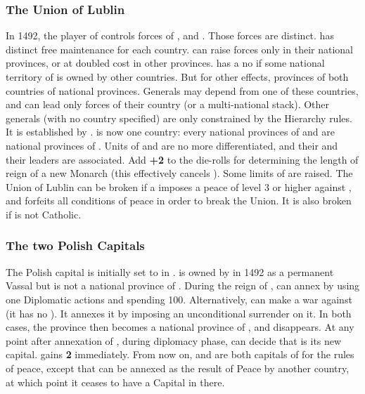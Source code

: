 \subsubsection{The Union of Lublin}
\aparag\label{chSpecific:Poland:Before Lublin} In 1492, the player of \POL
controls forces of ,  and
. Those forces are distinct.
\bparag \POL has distinct free maintenance for each country.
\bparag \POL can raise forces only in their national provinces, or at
doubled cost in other provinces.
\bparag \POL has a no \CB if some national territory of 
is owned by other countries. But for other effects, provinces of both
countries of national provinces.
\bparag Generals may depend from one of these countries, and can lead
only forces of their country (or a multi-national stack). Other generals
(with no country specified) are only constrained by the Hierarchy rules.
\label{chSpecific:Poland:Union Lublin} It is
established by .
\bparag \POL is now one country: every national provinces of
 and  are national provinces of \POL.
\bparag Units of  and  are no more
differentiated, and their  and their leaders are
associated.
\bparag Add {\bf +2} to the die-rolls for determining the length of
reign of a new Monarch (this effectively cancels
).
\bparag Some limits of \POL are raised.
\bparag The Union of Lublin can be broken if a \MAJ imposes a peace of
level 3 or higher against \POL, and forfeits all conditions of peace in
order to break the Union. It is also broken if \POL is not Catholic.
\subsubsection{The two Polish Capitals}\label{chSpecific:Poland:Mazowia}
\aparag The Polish capital is initially set to  in
.
\aparag {} is owned by  in 1492 as a
permanent Vassal but is not a national province of .
\aparag During the reign of , \POL can annex
 by using one Diplomatic actions and spending
100\ducats.
\bparag Alternatively, \POL can make a war against  (it
has no \CB). It annexes it by imposing an unconditional surrender on
it. In both cases, the province then becomes a national province of
, and  disappears.
\aparag At any point after annexation of , during
diplomacy phase, \POL can decide that  is its new
capital. \POL gains {\bf 2} \STAB immediately. From now on,
 and  are both capitals of \POL for the
rules of peace, except that  can be annexed as the
result of Peace by another country, at which point it ceases to have a
Capital in there.
